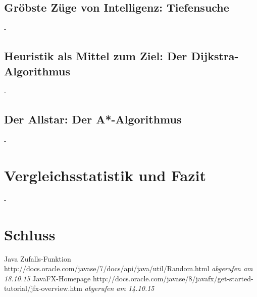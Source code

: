 \documentclass[12pt]{article}
\begin{document}
\subsection{Gröbste Züge von Intelligenz: Tiefensuche}
\newpage
-
\newpage

\subsection{Heuristik als Mittel zum Ziel: Der Dijkstra-Algorithmus}
\newpage
-
\newpage

\subsection{Der Allstar: Der A*-Algorithmus}
\newpage
-
\newpage

\section{Vergleichsstatistik und Fazit}
\newpage
-
\newpage

\section{Schluss}
\newpage

\begin{thebibliography}{9}
 Java Zufalls-Funktion http://docs.oracle.com/javase/7/docs/api/java/util/Random.html \emph{abgerufen am 18.10.15}
 JavaFX-Homepage http://docs.oracle.com/javase/8/javafx/get-started-tutorial/jfx-overview.htm \emph{abgerufen am 14.10.15}
\end{thebibliography}
\end{document}
